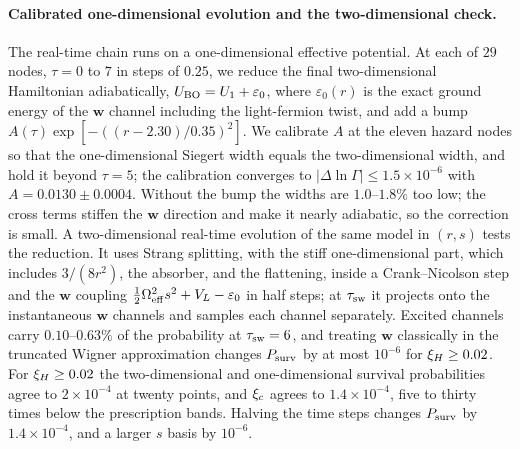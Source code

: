 \paragraph{Calibrated one-dimensional evolution and the two-dimensional check.}
The real-time chain runs on a one-dimensional effective potential.
At each of $29$ nodes, $\tau=0$ to $7$ in steps of $0.25$, we reduce the final two-dimensional Hamiltonian adiabatically, $U_{\rm BO}=U_1+\varepsilon_0$, where $\varepsilon_0(r)$ is the exact ground energy of the $\bm w$ channel including the light-fermion twist, and add a bump $A(\tau)\exp[-((r-2.30)/0.35)^2]$. %
We calibrate $A$ at the eleven hazard nodes so that the one-dimensional Siegert width equals the two-dimensional width, and hold it beyond $\tau=5$; the calibration converges to $|\Delta\ln\Gamma|\le1.5\times10^{-6}$ with $A=0.0130\pm0.0004$. %
Without the bump the widths are $1.0$--$1.8\%$ too low; the cross terms stiffen the $\bm w$ direction and make it nearly adiabatic, so the correction is small. %
A two-dimensional real-time evolution of the same model in $(r,s)$ tests the reduction.
It uses Strang splitting, with the stiff one-dimensional part, which includes $3/(8r^2)$, the absorber, and the flattening, inside a Crank--Nicolson step and the $\bm w$ coupling $\frac12\Omega_{\rm eff}^2s^2+V_L-\varepsilon_0$ in half steps; at $\tau_{\rm sw}$ it projects onto the instantaneous $\bm w$ channels and samples each channel separately.
Excited channels carry $0.10$--$0.63\%$ of the probability at $\tau_{\rm sw}=6$, and treating $\bm w$ classically in the truncated Wigner approximation changes $P_{\rm surv}$ by at most $10^{-6}$ for $\xi_H\ge0.02$. %
For $\xi_H\ge0.02$ the two-dimensional and one-dimensional survival probabilities agree to $2\times10^{-4}$ at twenty points, and $\xi_c$ agrees to $1.4\times10^{-4}$, five to thirty times below the prescription bands. %
Halving the time steps changes $P_{\rm surv}$ by $1.4\times10^{-4}$, and a larger $s$ basis by $10^{-6}$. %


